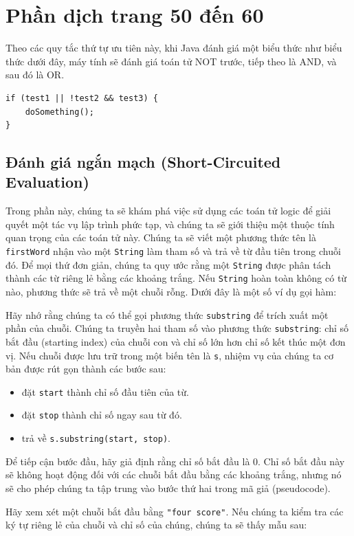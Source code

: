 \section{Phần dịch trang 50 đến 60}
Theo các quy tắc thứ tự ưu tiên này, khi Java đánh giá một biểu thức như biểu thức dưới đây, máy tính sẽ đánh giá toán tử NOT trước, tiếp theo là AND, và sau đó là OR.

\begin{verbatim}
if (test1 || !test2 && test3) {
    doSomething();
}
\end{verbatim}

\subsection*{Đánh giá ngắn mạch (Short-Circuited Evaluation)}

Trong phần này, chúng ta sẽ khám phá việc sử dụng các toán tử logic để giải quyết một tác vụ lập trình phức tạp, và chúng ta sẽ giới thiệu một thuộc tính quan trọng của các toán tử này. Chúng ta sẽ viết một phương thức tên là \texttt{firstWord} nhận vào một \texttt{String} làm tham số và trả về từ đầu tiên trong chuỗi đó. Để mọi thứ đơn giản, chúng ta quy ước rằng một \texttt{String} được phân tách thành các từ riêng lẻ bằng các khoảng trắng. Nếu \texttt{String} hoàn toàn không có từ nào, phương thức sẽ trả về một chuỗi rỗng. Dưới đây là một số ví dụ gọi hàm:

Hãy nhớ rằng chúng ta có thể gọi phương thức \texttt{substring} để trích xuất một phần của chuỗi. Chúng ta truyền hai tham số vào phương thức \texttt{substring}: chỉ số bắt đầu (starting index) của chuỗi con và chỉ số lớn hơn chỉ số kết thúc một đơn vị. Nếu chuỗi được lưu trữ trong một biến tên là \texttt{s}, nhiệm vụ của chúng ta cơ bản được rút gọn thành các bước sau:
\begin{itemize}
    \item đặt \texttt{start} thành chỉ số đầu tiên của từ.
    \item đặt \texttt{stop} thành chỉ số ngay sau từ đó.
    \item trả về \texttt{s.substring(start, stop)}.
\end{itemize}

Để tiếp cận bước đầu, hãy giả định rằng chỉ số bắt đầu là 0. Chỉ số bắt đầu này sẽ không hoạt động đối với các chuỗi bắt đầu bằng các khoảng trắng, nhưng nó sẽ cho phép chúng ta tập trung vào bước thứ hai trong mã giả (pseudocode).

Hãy xem xét một chuỗi bắt đầu bằng \texttt{"four score"}. Nếu chúng ta kiểm tra các ký tự riêng lẻ của chuỗi và chỉ số của chúng, chúng ta sẽ thấy mẫu sau:

